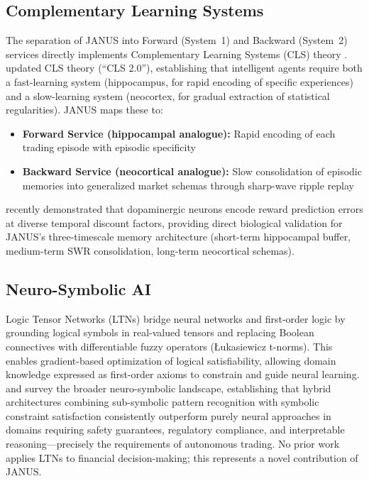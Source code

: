 \documentclass[12pt, a4paper]{article}
\begin{document}
\subsection{Complementary Learning Systems}
\label{sec:rw_cls}

The separation of JANUS into Forward (System~1) and Backward (System~2) services directly implements Complementary Learning Systems (CLS) theory \citep{mcclelland1995complementary}. \citet{kumaran2016cls} updated CLS theory (``CLS 2.0''), establishing that intelligent agents require both a fast-learning system (hippocampus, for rapid encoding of specific experiences) and a slow-learning system (neocortex, for gradual extraction of statistical regularities). JANUS maps these to:

\begin{itemize}
	\item \textbf{Forward Service (hippocampal analogue):} Rapid encoding of each trading episode with episodic specificity
	\item \textbf{Backward Service (neocortical analogue):} Slow consolidation of episodic memories into generalized market schemas through sharp-wave ripple replay \citep{wilson1994replay, buzsaki2015hippocampal}
\end{itemize}

\citet{masset2025multitimescale} recently demonstrated that dopaminergic neurons encode reward prediction errors at diverse temporal discount factors, providing direct biological validation for JANUS's three-timescale memory architecture (short-term hippocampal buffer, medium-term SWR consolidation, long-term neocortical schemas).

\subsection{Neuro-Symbolic AI}
\label{sec:rw_neurosymbolic}

Logic Tensor Networks (LTNs) \citep{badreddine2022logic, serafini2016ltn} bridge neural networks and first-order logic by grounding logical symbols in real-valued tensors and replacing Boolean connectives with differentiable fuzzy operators (Łukasiewicz t-norms). This enables gradient-based optimization of logical satisfiability, allowing domain knowledge expressed as first-order axioms to constrain and guide neural learning. \citet{marra2024neurosymbolic} and \citet{garcez2023neurosymbolic} survey the broader neuro-symbolic landscape, establishing that hybrid architectures combining sub-symbolic pattern recognition with symbolic constraint satisfaction consistently outperform purely neural approaches in domains requiring safety guarantees, regulatory compliance, and interpretable reasoning---precisely the requirements of autonomous trading. No prior work applies LTNs to financial decision-making; this represents a novel contribution of JANUS.
\end{document}
